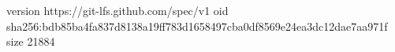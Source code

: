 version https://git-lfs.github.com/spec/v1
oid sha256:bdb85ba4fa837d8138a19ff783d1658497cba0df8569e24ea3dc12dae7aa971f
size 21884
